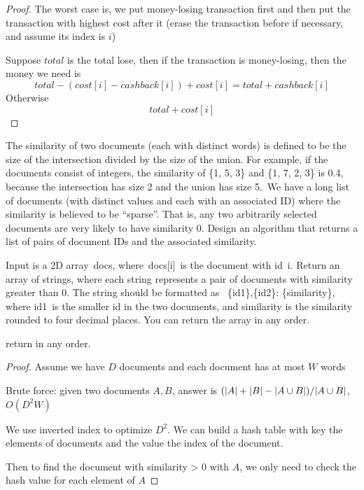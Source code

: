 \documentclass[11pt]{article}
\begin{document}
\begin{proof}
The worst case is, we put money-losing transaction first and then put the transaction with
highest cost after it (erase the transaction before if necessary, and assume its index is \(i\))

Suppose \(total\) is the total lose, then if the transaction is money-losing, then the money we need is
\begin{equation*}
total-(cost[i]-cashback[i])+cost[i] = total+cashback[i]
\end{equation*}
Otherwise
\begin{equation*}
total+cost[i]
\end{equation*}
\end{proof}


\begin{problem}
The similarity of two documents (each with distinct words) is defined to be the size of the
intersection divided by the size of the union. For example, if the documents consist of
integers, the similarity of \{1, 5, 3\} and \{1, 7, 2, 3\} is 0.4, because the intersection has size
2 and the union has size 5. We have a long list of documents (with distinct values and each with
an associated ID) where the similarity is believed to be ``sparse''. That is, any two arbitrarily
selected documents are very likely to have similarity 0. Design an algorithm that returns a list
of pairs of document IDs and the associated similarity.

Input is a 2D array docs, where docs[i] is the document with id i. Return an array of strings,
where each string represents a pair of documents with similarity greater than 0. The string
should be formatted as  \{id1\},\{id2\}: \{similarity\}, where id1 is the smaller id in the two
documents, and similarity is the similarity rounded to four decimal places. You can return the
array in any order.

return in any order.
\end{problem}

\begin{proof}
Assume we have \(D\) documents and each document has at most \(W\) words

Brute force: given two documents \(A, B\), answer
is \((\abs{A}+\abs{B}-\abs{A\cup B})/\abs{A\cup B}\), \(O(D^2W)\)

We use inverted index to optimize \(D^2\). We can build a hash table with key the elements of
documents and the value the index of the document.

Then to find the document with similarity > 0 with \(A\), we only need to check the hash value
for each element of \(A\)
\end{proof}
\end{document}
